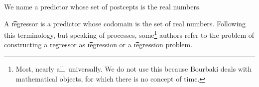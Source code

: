 

We name a predictor whose set of postcepts is the real numbers.


A \t{regressor} is a predictor whose codomain is the set of real numbers.
Following this terminology, but speaking of processes, some\footnote{Most, nearly all, universally. We do not use this because Bourbaki deals with mathematical objects, for which there is no concept of time.} authors refer to the problem of constructing a regressor as \t{regression} or a \t{regression problem}.

\blankpage
